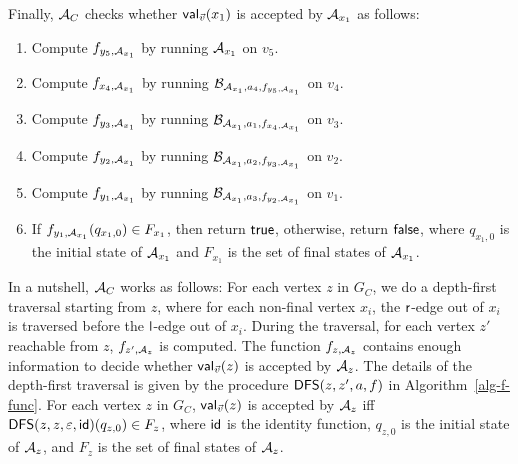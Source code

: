 \documentclass{llncs}
\begin{document}
Finally, $\mathcal{A}_C$ checks whether $\mathsf{val}_{\vec{v}}(x_1)$ is accepted by $\mathcal{A}_{x_1}$ as follows:
\begin{enumerate}
\item Compute $f_{y_5,\mathcal{A}_{x_1}}$  by running $\mathcal{A}_{x_1}$ on $v_5$. 
%
\item Compute $f_{x_4, \mathcal{A}_{x_1}}$ by running $\mathcal{B}_{\mathcal{A}_{x_1}, a_4, f_{y_5,\mathcal{A}_{x_1}}}$ on $v_4$.
%
\item Compute $f_{y_3, \mathcal{A}_{x_1}}$ by running $\mathcal{B}_{\mathcal{A}_{x_1}, a_1, f_{x_4, \mathcal{A}_{x_1}}}$ on $v_3$. 
%
\item Compute $f_{y_2, \mathcal{A}_{x_1}}$ by running $\mathcal{B}_{\mathcal{A}_{x_1}, a_2, f_{y_3, \mathcal{A}_{x_1}}}$ on $v_2$.
%
\item Compute $f_{y_1, \mathcal{A}_{x_1}}$ by running $\mathcal{B}_{\mathcal{A}_{x_1}, a_3, f_{y_2, \mathcal{A}_{x_1}}}$ on $v_1$.
%
 \item If $f_{y_1, \mathcal{A}_{x_1}}(q_{x_1,0}) \in F_{x_1}$, then return ${\sf true}$, otherwise, return ${\sf false}$, where $q_{x_1,0}$ is the initial state of $\mathcal{A}_{x_1}$ and $F_{x_1}$ is the set of final states of $\mathcal{A}_{x_1}$.
\end{enumerate}


\vspace{-5mm}

\begin{algorithm}[htbp]
\caption{$\dfs(z, z', a, f)$\label{alg-f-func}}
\end{algorithm}
\vspace{-3mm}


In a nutshell, $\mathcal{A}_C$ works as follows: For each vertex $z$ in $G_C$, we do a depth-first traversal starting from $z$, where for each non-final vertex $x_i$,  the $\mathsf{r}$-edge out of $x_i$ is traversed before  the $\mathsf{l}$-edge out of $x_i$. During the traversal, for each vertex $z'$ reachable from $z$, $f_{z', \mathcal{A}_z}$ is computed. 
The function $f_{z,\mathcal{A}_z}$ contains enough information to decide whether $\mathsf{val}_{\vec{v}}(z)$ is accepted by $\mathcal{A}_z$. The details of the depth-first traversal is given by the procedure $\dfs(z, z', a, f)$ in Algorithm~\ref{alg-f-func}. For each vertex $z$ in $G_C$, $\mathsf{val}_{\vec{v}}(z)$ is accepted by $\mathcal{A}_z$ iff $\mathsf{DFS}(z, z, \varepsilon, {\sf id})(q_{z,0}) \in F_z$, where ${\sf id}$ is the identity function, $q_{z,0}$ is the initial state of $\mathcal{A}_z$, and $F_z$ is the set of final states of $\mathcal{A}_z$.
\end{document}
